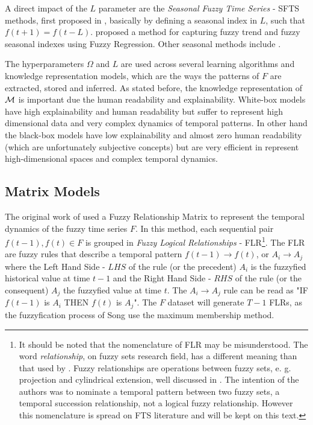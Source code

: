 A direct impact of the $L$ parameter are the  \textit{Seasonal Fuzzy Time Series} - SFTS methods, first proposed  in \cite{Song1997}, basically by defining a seasonal index in $L$, such that $f(t+1) = f(t-L)$. \cite{Chang1997} proposed a method for capturing fuzzy trend and fuzzy seasonal indexes using Fuzzy Regression. Other seasonal methods include \cite{Tseng1999, Song1999, Lee2011}. 

The hyperparameters $\Omega$ and $L$ are used across several learning algorithms and knowledge representation models, which are the ways the patterns of $F$ are extracted, stored and inferred. As stated before, the knowledge representation of $\mathcal{M}$ is important due the human readability and explainability. White-box models have high explainability and human readability but suffer to represent high dimensional data and very complex dynamics of temporal patterns. In other hand the black-box models have low explainability and almost zero human readability (which are unfortunately subjective concepts) but are very efficient in represent high-dimensional spaces and complex temporal dynamics.


%
\subsection{Matrix Models}
\label{sec:fts_matrix}

The original work of \cite{song1993fuzzy} used a Fuzzy Relationship Matrix to represent the temporal dynamics of the fuzzy time series $F$. In this method, each sequential pair $f(t-1),f(t) \in F$ is grouped in \textit{Fuzzy Logical Relationships} - FLR\footnote{It should be noted that the nomenclature of FLR may be misunderstood. The word \textit{relationship}, on fuzzy sets research field, has a different meaning than that used by \citeauthor{song1993fuzzy}. Fuzzy relationships are operations between fuzzy sets, e. g. projection and cylindrical extension, well discussed in \cite{Klir1995}. The intention of the authors was to nominate a temporal pattern between two fuzzy sets, a temporal succession relationship, not a logical fuzzy relationship.  However this nomenclature is spread on FTS literature and will be kept on this text.}. The FLR are fuzzy rules that describe a temporal pattern $f(t-1) \rightarrow f(t)$, or $A_i \rightarrow A_j$ where the Left Hand Side - $LHS$ of the rule (or the precedent)  $A_i$ is the fuzzyfied historical value at time $t-1$ and the Right Hand Side - $RHS$ of the rule (or the consequent) $A_j$ the fuzzyfied value at time $t$. The $A_i \rightarrow A_j$ rule can be read as "IF $f(t-1)$ is $A_i$ THEN $f(t)$ is $A_j$". The $F$ dataset will generate $T-1$ FLRs, as the fuzzyfication process of Song use the maximum membership method.

